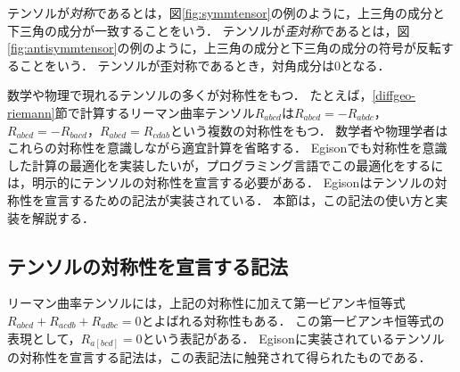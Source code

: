 テンソルが\emph{対称}であるとは，図\ref{fig:symmtensor}の例のように，上三角の成分と下三角の成分が一致することをいう．
テンソルが\emph{歪対称}であるとは，図\ref{fig:antisymmtensor}の例のように，上三角の成分と下三角の成分の符号が反転することをいう．
テンソルが歪対称であるとき，対角成分は0となる．

数学や物理で現れるテンソルの多くが対称性をもつ．
たとえば，\ref{diffgeo-riemann}節で計算するリーマン曲率テンソル$R_{abcd}$は$R_{abcd} = -R_{abdc}$，$R_{abcd} = -R_{bacd}$，$R_{abcd} = R_{cdab}$という複数の対称性をもつ．
数学者や物理学者はこれらの対称性を意識しながら適宜計算を省略する．
Egisonでも対称性を意識した計算の最適化を実装したいが，プログラミング言語でこの最適化をするには，明示的にテンソルの対称性を宣言する必要がある．
Egisonはテンソルの対称性を宣言するための記法が実装されている．
本節は，この記法の使い方と実装を解説する．

\subsection{テンソルの対称性を宣言する記法}

リーマン曲率テンソルには，上記の対称性に加えて第一ビアンキ恒等式$R_{abcd} + R_{acdb} + R_{adbc} = 0$とよばれる対称性もある．
この第一ビアンキ恒等式の表現として，$R_{a[bcd]} = 0$という表記がある．
Egisonに実装されているテンソルの対称性を宣言する記法は，この表記法に触発されて得られたものである．

